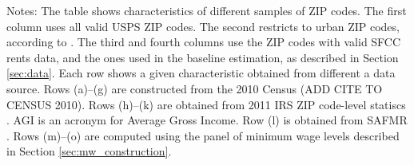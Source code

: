 \begin{landscape}
\begin{table}[hbt!]
    \begin{minipage}{.95\linewidth} \footnotesize
        \vspace{2mm}
        Notes: The table shows characteristics of different samples of ZIP codes.
        The first column uses all valid USPS ZIP codes.
        The second restricts to urban ZIP codes, according to \textcite{MissouriCDC}.
        The third and fourth columns use the ZIP codes with valid SFCC rents 
        data, and the ones used in the baseline estimation, as described in
        Section \ref{sec:data}.
        Each row shows a given characteristic obtained from different a data 
        source.
        Rows (a)--(g) are constructed from the 2010 Census (ADD CITE TO CENSUS 2010).
        Rows (h)--(k) are obtained from 2011 IRS ZIP code-level statiscs 
        \textcite{IRS}. AGI is an acronym for Average Gross Income.
        Row (l) is obtained from SAFMR \textcite{hudSAFMR}.
        Rows (m)--(o) are computed using the panel of minimum wage levels 
        described in Section \ref{sec:mw_construction}.
    \end{minipage}
\end{table}
\end{landscape}
